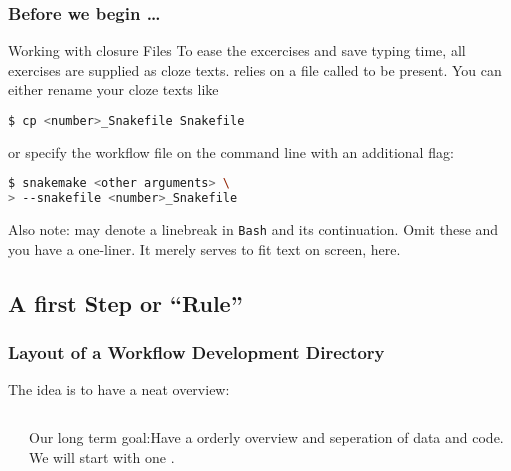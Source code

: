 \begin{frame}[fragile]
  \frametitle{Before we begin \ldots}
  \begin{exampleblock}{Working with closure Files}
    To ease the excercises and save typing time, all exercises are supplied as cloze texts.\linebreak
    \Snakemake{} relies on a file called \Snakemake{} to be present. You can either rename your cloze texts like
    \begin{lstlisting}[language=Bash, style=Shell]
$ cp <number>_Snakefile Snakefile
    \end{lstlisting}
    or specify the workflow file on the command line with an additional flag:
    \begin{lstlisting}[language=Bash, style=Shell]
$ snakemake <other arguments> \
> --snakefile <number>_Snakefile
    \end{lstlisting}
    Also note: \altverb{\\} may denote a linebreak in \texttt{Bash} and \altverb{>} its continuation. Omit these and you have a one-liner. It merely serves to fit text on screen, here.
  \end{exampleblock}
\end{frame}


\subsection{A first Step or ``Rule''}

\begin{frame}[fragile]
  \frametitle{Layout of a Workflow Development Directory} 
  The idea is to have a neat overview:
  \begin{columns}
    \begin{column}{0.5\textwidth}
      
  \begin{minipage}[t]{0.5\textwidth}
            {\tiny \DTsetlength{0.2em}{1em}{0.2em}{0.4pt}{.6pt}
}
    \end{minipage}
    \end{column}
    \begin{column}{0.5\textwidth}
      \begin{hint}
      	Our long term goal:\newline Have a orderly overview and seperation of data and code. We will start with one .
      \end{hint}
    \end{column}
  \end{columns}
\end{frame}

